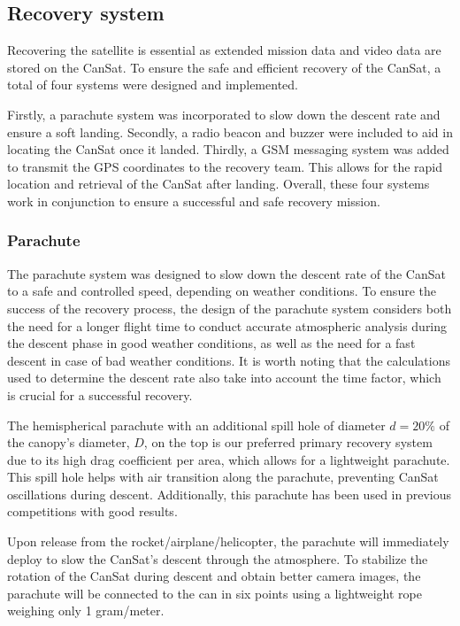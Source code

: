 \documentclass[11pt]{article}
\begin{document}
\subsection{Recovery system}
Recovering the satellite is essential as extended mission data and video data are stored on the
CanSat. To ensure the safe and efficient recovery of the CanSat, a total of four systems were designed and implemented. 

Firstly, a parachute system was incorporated to slow down the descent rate and ensure a soft landing. Secondly, a radio beacon and buzzer were included to aid in locating the CanSat once it landed. Thirdly, a GSM messaging system was added to transmit the GPS coordinates to the recovery team. This allows for the rapid location and retrieval of the CanSat after landing. Overall, these four systems work in conjunction to ensure a successful and safe recovery mission.

\subsubsection{Parachute}
The parachute system was designed to slow down the descent rate of the CanSat to a safe and controlled speed, depending on weather conditions. To ensure the success of the recovery process, the design of the parachute system considers both the need for a longer flight time to conduct accurate atmospheric analysis during the descent phase in good weather conditions, as well as the need for a fast descent in case of bad weather conditions. It is worth noting that the calculations used to determine the descent rate also take into account the time factor, which is crucial for a successful recovery.

The hemispherical parachute with an additional spill hole of diameter $d=20\%$ of the canopy's diameter, $D$, on the top is our preferred primary recovery system due to its high drag coefficient per area, which allows for a lightweight parachute. This spill hole helps with air transition along the parachute, preventing CanSat oscillations during descent. Additionally, this parachute has been used in previous competitions with good results. 

Upon release from the rocket/airplane/helicopter, the parachute will immediately deploy to slow the CanSat's descent through the atmosphere. To stabilize the rotation of the CanSat during descent and obtain better camera images, the parachute will be connected to the can in six points using a lightweight rope weighing only 1 gram/meter.
\end{document}
